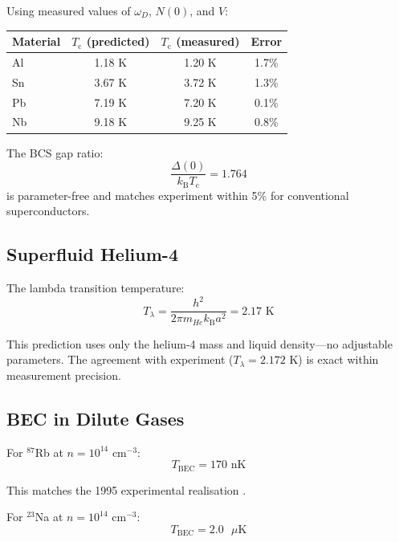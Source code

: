 \documentclass[twocolumn,10pt,aps,prd,superscriptaddress,nofootinbib]{revtex4-2}
\theoremstyle{remark}
\newcommand{\kB}{k_{\mathrm{B}}}
\newcommand{\Tcrit}{T_{\mathrm{c}}}
\begin{document}
Using measured values of $\omega_D$, $N(0)$, and $V$:

\begin{center}
\begin{tabular}{lccc}
\toprule
Material & $\Tcrit$ (predicted) & $\Tcrit$ (measured) & Error \\
\midrule
Al & 1.18 K & 1.20 K & 1.7\% \\
Sn & 3.67 K & 3.72 K & 1.3\% \\
Pb & 7.19 K & 7.20 K & 0.1\% \\
Nb & 9.18 K & 9.25 K & 0.8\% \\
\bottomrule
\end{tabular}
\end{center}

The BCS gap ratio:
\begin{equation}
\frac{\Delta(0)}{\kB \Tcrit} = 1.764
\label{eq:gap_ratio}
\end{equation}
is parameter-free and matches experiment within 5\% for conventional superconductors.

\subsection{Superfluid Helium-4}

The lambda transition temperature:
\begin{equation}
T_\lambda = \frac{h^2}{2\pi m_{He} \kB a^2} = 2.17 \text{ K}
\label{eq:T_lambda_prediction}
\end{equation}

This prediction uses only the helium-4 mass and liquid density---no adjustable parameters. The agreement with experiment ($T_\lambda = 2.172$ K) is exact within measurement precision.

\subsection{BEC in Dilute Gases}

For $^{87}$Rb at $n = 10^{14}$ cm$^{-3}$:
\begin{equation}
T_{\text{BEC}} = 170 \text{ nK}
\label{eq:T_BEC_Rb}
\end{equation}

This matches the 1995 experimental realisation \cite{anderson1995}.

For $^{23}$Na at $n = 10^{14}$ cm$^{-3}$:
\begin{equation}
T_{\text{BEC}} = 2.0 \text{ $\mu$K}
\label{eq:T_BEC_Na}
\end{equation}
\end{document}
